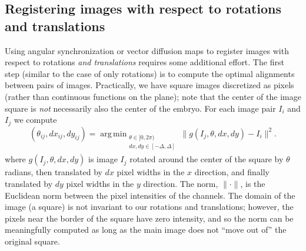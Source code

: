 \documentclass{pnastwo}
\DeclareMathOperator*{\argmin}{arg\,min}
\begin{document}
\begin{article}
\subsection{Registering images with respect to rotations and translations} \label{subsec:trans_rot_register}

Using angular synchronization or vector diffusion maps to register images with respect to rotations {\it and translations} requires some additional effort.
%
%
%
The first step (similar to the case of only rotations) is to compute the optimal alignments between pairs of images.
%
Practically, we have square images discretized as pixels (rather than continuous functions on the plane); note that the center of the
image square is {\em not} necessarily also the center of the embryo.
%
For each image pair $I_i$ and $I_j$ we compute
\begin{equation}\label{eq:opt_pairwise}
(\theta_{ij}, dx_{ij}, dy_{ij}) = \argmin_{
\begin{matrix}
\theta \in [0, 2\pi) \\
dx, dy \in [-\Delta, \Delta]\\
\end{matrix}
} \|g(I_j, \theta, dx, dy) - I_i \|^2.
\end{equation}
where $g(I_j, \theta, dx, dy)$ is image $I_j$ rotated around the center of the square by $\theta$ radians, then translated by $dx$ pixel widths in the $x$ direction, and finally translated by $dy$ pixel widths in the $y$ direction.
%
The norm, $\| \cdot \|$, is the Euclidean norm between the pixel intensities of the channels.
%
The domain of the image (a square) is not invariant to our rotations and translations; however, the pixels near the border of the square have zero intensity, and so the norm can be meaningfully computed as long as the main image does not ``move out of'' the original square.
%

\end{article}
\end{document}
